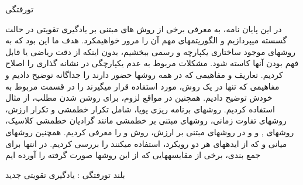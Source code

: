 


\pagestyle{empty}

‌تورفتگی

 در این پایان نامه، به معرفی برخی از روش های مبتنی بر یادگیری تقویتی در حالت گسسته می\nf پردازیم و الگوریتم\nf های مهم آن را مرور خواهیم\nf کرد. 
هدف ما این بود که به روش\nf های موجود ساختاری یکپارچه و رسمی ببخشیم،
 بدون اینکه از دقت ریاضی یا قابل فهم بودن آن\nf ها کاسته شود.
 مشکلات مربوط به عدم یکپارچگی در نشانه گذاری را اصلاح کردیم.
 تعاریف و مفاهیمی که در همه روش\nf ها حضور دارند را جداگانه توضیح دادیم و مفاهیمی که تنها در یک روش، مورد استفاده قرار می\nf گیرند را در قسمت مربوط به خودش توضیح دادیم.
همچنین در مواقع لزوم، برای روشن شدن مطلب، از مثال استفاده کردیم.
روش\nf های برنامه ریزی پویا، شامل تکرار خط\nf مشی و تکرار ارزش، روش\nf های تفاوت زمانی، روش\nf های مبتنی بر خط\nf مشی مانند گرادیان خط\nf مشی کلاسیک، روش\nf های 
,
و
و در روش\nf های مبتنی بر ارزش، روش
و
را معرفی کردیم. همچنین روش\nf های میانی 
و
که از ایده\nf های هر دو رویکرد، استفاده می\nf کنند را بررسی کردیم.
در انتها برای جمع بندی، برخی از مقایسه\nf هایی که از این روش\nf ها صورت گرفته را آورده ایم


‌بلند
‌تورفتگی : 
یادگیری تقویتی
‌جدید
